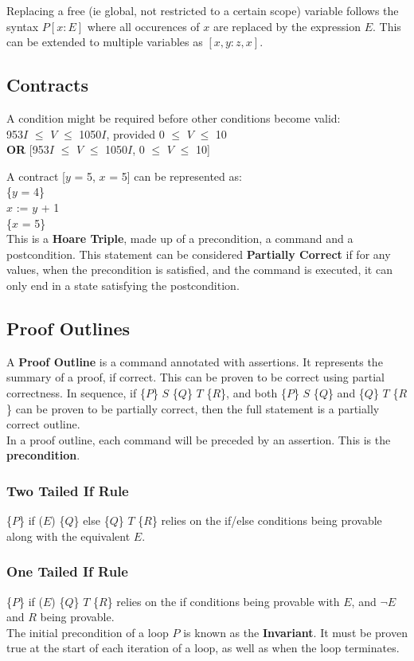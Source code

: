 \documentclass[11pt]{article}
\begin{document}
Replacing a free (ie global, not restricted to a certain scope) variable follows the syntax $P[x:E]$ where all occurences of $x$ are replaced by the expression $E$. This can be extended to multiple variables as $[x,y:z,x]$.

\subsection{Contracts}

A condition might be required before other conditions become valid: \\

953$I$ $\leq$ $V$ $\leq$ 1050$I$, provided 0 $\leq$ $V$ $\leq$ 10 \\\textbf{OR} 
[953$I$ $\leq$ $V$ $\leq$ 1050$I$, 0 $\leq$ $V$ $\leq$ 10] 

A contract [$y$ = 5, $x$ = 5] can be represented as: \\

\{$y$ = 4\} \\
$x$ := $y$ + 1 \\
\{$x$ = 5\} \\

This is a \textbf{Hoare Triple}, made up of a precondition, a command and a postcondition. This statement can be considered \textbf{Partially Correct} if for any values, when the precondition is satisfied, and the command is executed, it can only end in a state satisfying the postcondition.

\subsection{Proof Outlines}

A \textbf{Proof Outline} is a command annotated with assertions. It represents the summary of a proof, if correct. This can be proven to be correct using partial correctness. In sequence, if \{$P$\} $S$ \{$Q$\} $T$ \{$R$\}, and both \{$P$\} $S$ \{$Q$\} and \{$Q$\} $T$ \{$R$\} can be proven to be partially correct, then the full statement is a partially correct outline. \\

In a proof outline, each command will be preceded by an assertion. This is the \textbf{precondition}.

\subsubsection{Two Tailed If Rule}
\{$P$\} if ($E$) \{$Q$\} else \{$Q$\} $T$ \{$R$\} relies on the if/else conditions being provable along with the equivalent $E$. \\
\subsubsection{One Tailed If Rule}
\{$P$\} if ($E$) \{$Q$\} $T$ \{$R$\} relies on the if conditions being provable with $E$, and $\neg$$E$ and $R$ being provable.  \\

The initial precondition of a loop $P$ is known as the \textbf{Invariant}. It must be proven true at the start of each iteration of a loop, as well as when the loop terminates. \\
\end{document}
